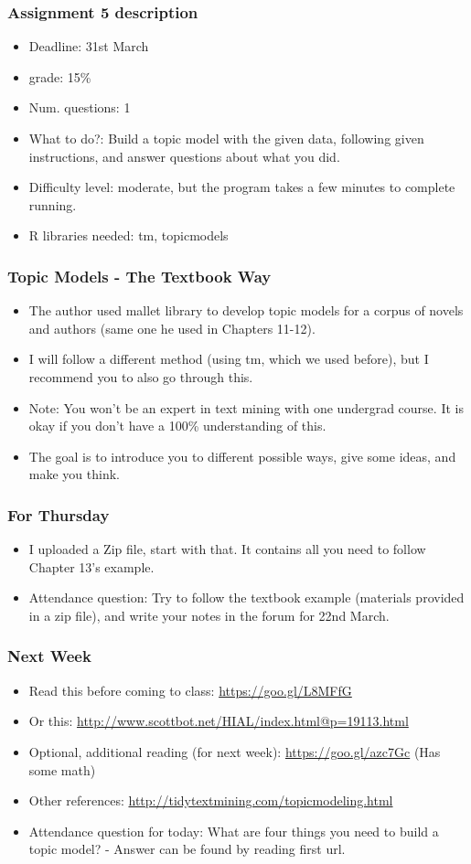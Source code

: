 \documentclass{beamer}
\begin{document}
\begin{frame}
\frametitle{Assignment 5 description}
\begin{itemize}
\item Deadline: 31st March
\item grade: 15\%
\item Num. questions: 1
\item What to do?: Build a topic model with the given data, following given instructions, and answer questions about what you did. 
\item Difficulty level: moderate, but the program takes a few minutes to complete running. 
\item R libraries needed: tm, topicmodels
\end{itemize}
\end{frame}

\begin{frame}
\frametitle{Topic Models - The Textbook Way}
\begin{itemize}
\item The author used mallet library to develop topic models for a corpus of novels and authors (same one he used in Chapters 11-12).
\item I will follow a different method (using tm, which we used before), but I recommend you to also go through this.
\item Note: You won't be an expert in text mining with one undergrad course. It is okay if you don't have a 100\% understanding of this.
\item The goal is to introduce you to different possible ways, give some ideas, and make you think.  
\end{itemize}
\end{frame}

\begin{frame}
\frametitle{For Thursday}
\begin{itemize}
\item I uploaded a Zip file, start with that. It contains all you need to follow Chapter 13's example.
\item Attendance question: Try to follow the textbook example (materials provided in a zip file), and write your notes in the forum for 22nd March. 
\end{itemize}
\end{frame}

\begin{frame}
\frametitle{Next Week}
\begin{itemize}
\item Read this before coming to class: \url{https://goo.gl/L8MFfG}
\item Or this: \url{http://www.scottbot.net/HIAL/index.html@p=19113.html}
\item Optional, additional reading (for next week): \url{https://goo.gl/azc7Gc} (Has some math)
\item Other references: \url{http://tidytextmining.com/topicmodeling.html}
\item Attendance question for today: What are four things you need to build a topic model? - Answer can be found by reading first url. 
\end{itemize}
\end{frame}
\end{document}
